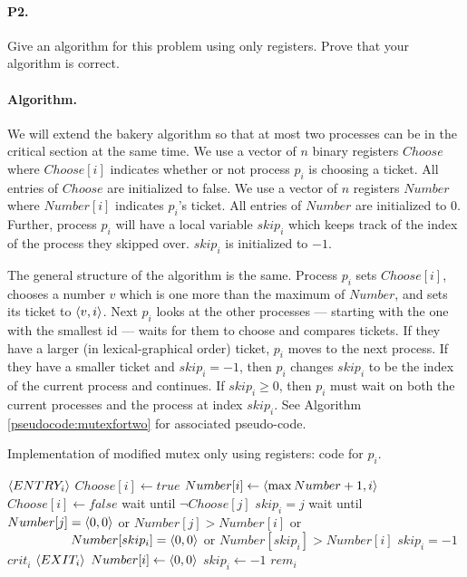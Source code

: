 \documentclass[11pt]{article}
\DeclarePairedDelimiter\anglebrac{\langle}{\rangle}
\begin{document}
\paragraph{P2.} Give an algorithm for this problem using only registers. Prove that your algorithm is correct.

\paragraph{Algorithm.} We will extend the bakery algorithm so that at most two processes can be in the critical section at the same time. We use a vector of $n$ binary registers $Choose$ where $Choose[i]$ indicates whether or not process $p_i$ is choosing a ticket. All entries of $Choose$ are initialized to false. We use a vector of $n$ registers $Number$ where $Number[i]$ indicates $p_i$'s ticket. All entries of $Number$ are initialized to $0$. Further, process $p_i$ will have a local variable $skip_i$ which keeps track of the index of the process they skipped over. $skip_i$ is initialized to $-1$. 

The general structure of the algorithm is the same. Process $p_i$ sets $Choose[i]$, chooses a number $v$ which is one more than the maximum of $Number$, and sets its ticket to $\anglebrac{v,i}$. Next $p_i$ looks at the other processes --- starting with the one with the smallest id --- waits for them to choose and compares tickets. If they have a larger (in lexical-graphical order) ticket, $p_i$ moves to the next process. If they have a smaller ticket and $skip_i = -1$, then $p_i$ changes $skip_i$ to be the index of the current process and continues. If $skip_i \geq 0$, then $p_i$ must wait on both the current processes and the process at index $skip_i$. See Algorithm \ref{pseudocode:mutexfortwo} for associated pseudo-code.

\begin{algorithm}[ht]
	\caption{Implementation of modified mutex only using registers: code for $p_i$.}
    \label{pseudocode:mutexfortwo}
    \begin{algorithmic}[1]
	\State $\anglebrac{ENTRY_i}$
	\State $Choose[i] \leftarrow true$
	\State $Number[i] \leftarrow \anglebrac{\max Number + 1, i}$
	\State $Choose[i] \leftarrow false$
		\State wait until $\lnot Choose[j]$
				\State $skip_i = j$
			\EndIf
		\Else
			\State wait until $Number[j] = \anglebrac{0, 0}$ or $Number[j] > Number[i]$ or
			\State $\qquad\qquad\quad Number[skip_i] = \anglebrac{0, 0}$ or $Number[skip_i] > Number[i]$
				\State $skip_i = -1$
			\EndIf
		\EndIf
	\EndFor
	\State $crit_i$
	\State
	\State $\anglebrac{EXIT_i}$
	\State $Number[i] \leftarrow \anglebrac{0,0}$
	\State $skip_i \leftarrow -1$
	\State $rem_i$
	\end{algorithmic}
\end{algorithm} 
\end{document}
